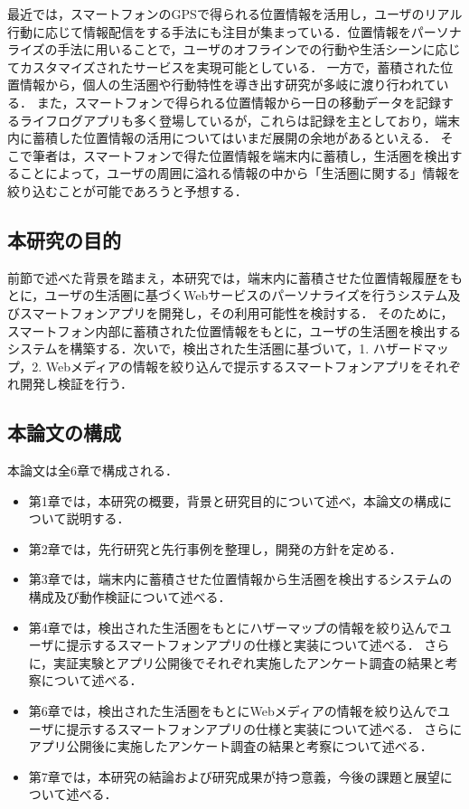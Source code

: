 \documentclass[a4paper]{jsarticle}
\begin{document}
最近では，スマートフォンのGPSで得られる位置情報を活用し，ユーザのリアル行動に応じて情報配信をする手法にも注目が集まっている．位置情報をパーソナライズの手法に用いることで，ユーザのオフラインでの行動や生活シーンに応じてカスタマイズされたサービスを実現可能としている\cite{tameco}\cite{bitblend}．
一方で，蓄積された位置情報から，個人の生活圏や行動特性を導き出す研究が多岐に渡り行われている\cite{matsuo}\cite{docomo}．
また，スマートフォンで得られる位置情報から一日の移動データを記録するライフログアプリも多く登場しているが，これらは記録を主としており，端末内に蓄積した位置情報の活用についてはいまだ展開の余地があるといえる．
そこで筆者は，スマートフォンで得た位置情報を端末内に蓄積し，生活圏を検出することによって，ユーザの周囲に溢れる情報の中から「生活圏に関する」情報を絞り込むことが可能であろうと予想する．


\subsection{本研究の目的}
前節で述べた背景を踏まえ，本研究では，端末内に蓄積させた位置情報履歴をもとに，ユーザの生活圏に基づくWebサービスのパーソナライズを行うシステム及びスマートフォンアプリを開発し，その利用可能性を検討する．
そのために，スマートフォン内部に蓄積された位置情報をもとに，ユーザの生活圏を検出するシステムを構築する．次いで，検出された生活圏に基づいて，1. ハザードマップ，2. Webメディアの情報を絞り込んで提示するスマートフォンアプリをそれぞれ開発し検証を行う．

\subsection{本論文の構成}
本論文は全6章で構成される．
\begin{itemize}
  \item
第1章では，本研究の概要，背景と研究目的について述べ，本論文の構成について説明する．
  \item
第2章では，先行研究と先行事例を整理し，開発の方針を定める．
  \item
第3章では，端末内に蓄積させた位置情報から生活圏を検出するシステムの構成及び動作検証について述べる．
  \item
第4章では，検出された生活圏をもとにハザーマップの情報を絞り込んでユーザに提示するスマートフォンアプリの仕様と実装について述べる．
さらに，実証実験とアプリ公開後でそれぞれ実施したアンケート調査の結果と考察について述べる．
  \item
第6章では，検出された生活圏をもとにWebメディアの情報を絞り込んでユーザに提示するスマートフォンアプリの仕様と実装について述べる．
さらにアプリ公開後に実施したアンケート調査の結果と考察について述べる．
  \item
第7章では，本研究の結論および研究成果が持つ意義，今後の課題と展望について述べる．
\end{itemize}
\end{document}
